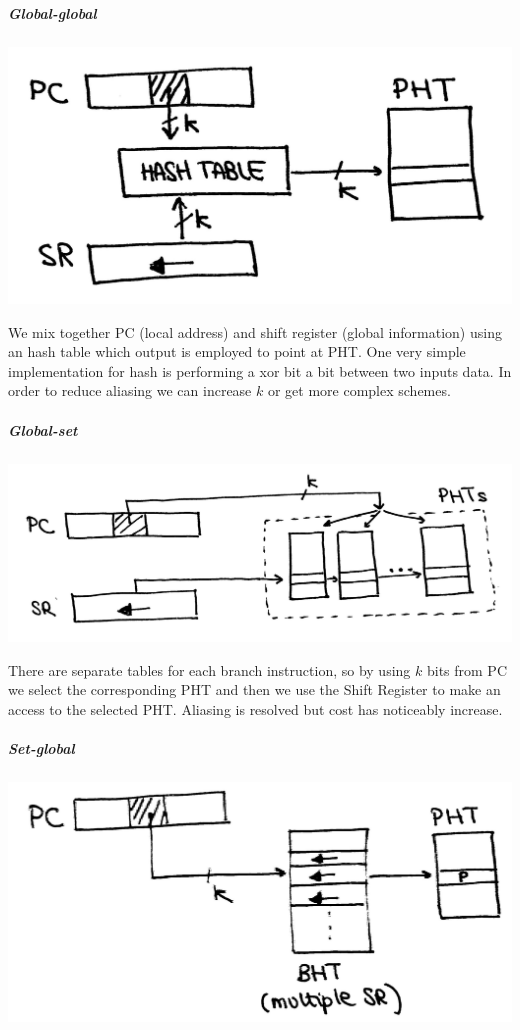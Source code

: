 \subparagraph{Global-global}
\begin{center}
  \includegraphics[width=0.6\linewidth]{img/img3/20}
\end{center}

We mix together PC (local address) and shift register (global information) using an hash table which output is employed to point at PHT. One very simple implementation for hash is performing a xor bit a bit between two inputs data. In order to reduce aliasing we can increase $k$ or get more complex schemes.

\subparagraph{Global-set}
\begin{center}
  \includegraphics[width=0.7\linewidth]{img/img3/21}
\end{center}

There are separate tables for each branch instruction, so by using $k$ bits from PC we select the corresponding PHT and then we use the Shift Register to make an access to the selected PHT. Aliasing is resolved but cost has noticeably increase.


\subparagraph{Set-global}

\begin{center}
  \includegraphics[width=0.7\linewidth]{img/img3/22}
\end{center}

